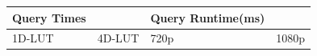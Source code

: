 \begin{tabular}{llll}
\toprule
Query Times &  & Query Runtime(ms) &  \\
\midrule
1D-LUT & 4D-LUT & 720p & 1080p \\
\bottomrule
\end{tabular}
